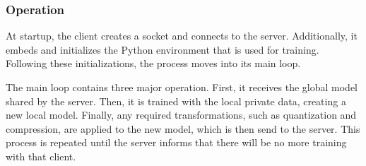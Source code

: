 \subsubsection{Operation}
At startup, the client creates a socket and connects to the server. Additionally, it embeds and initializes the Python environment that is used for training.  Following these initializations, the process moves into its main loop.

The main loop contains three major operation. First, it receives the global model shared by the server. Then, it is trained with the local private data, creating a new local model. Finally, any required transformations, such as quantization and compression, are applied to the new model, which is then send to the server. This process is repeated until the server informs that there will be no more training with that client.

